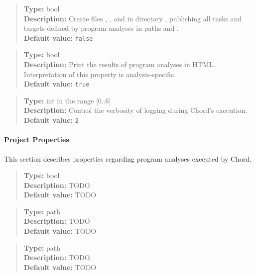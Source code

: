 \begin{quote}
{\bf Type:} bool \\
{\bf Description:} Create files , , and  in directory , publishing all tasks and targets defined by program analyses in paths  and .  \\
{\bf Default value:} {\tt false}
\end{quote}

\begin{quote}
{\bf Type:} bool \\
{\bf Description:} Print the results of program analyses in HTML.  Interpretation of this property is analysis-specific.  \\
{\bf Default value:} {\tt true}
\end{quote}

\begin{quote}
{\bf Type:} int in the range [0..6]  \\
{\bf Description:} Control the verbosity of logging during Chord's execution.  \\
{\bf Default value:} {\tt 2}
\end{quote}

\paragraph{Project Properties}

This section describes properties regarding program analyses executed by Chord.

\begin{quote}
{\bf Type:} bool \\
{\bf Description:} TODO \\
{\bf Default value:} TODO
\end{quote}

\begin{quote}
{\bf Type:} path \\
{\bf Description:} TODO \\
{\bf Default value:} TODO
\end{quote}

\begin{quote}
{\bf Type:} path \\
{\bf Description:} TODO \\
{\bf Default value:} TODO
\end{quote}

